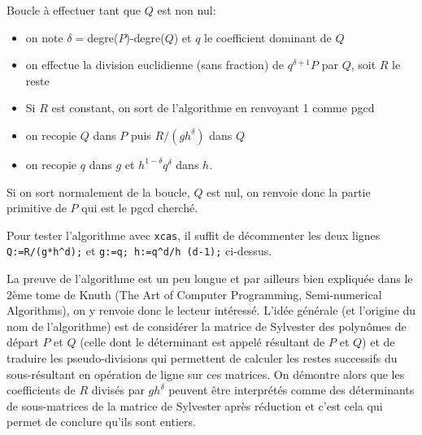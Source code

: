 \documentclass[a4paper,11pt]{book}
\begin{document}
\begin{giacjshere}
Boucle à effectuer tant que $Q$ est non nul:
\begin{itemize}
  \item on note $\delta =$degre($P$)-degre($Q$) et $q$ le coefficient dominant
  de $Q$
  
  \item on effectue la division euclidienne (sans fraction) de $q^{\delta + 1}
  P$ par $Q$, soit $R$ le reste
  
  \item Si $R$ est constant, on sort de l'algorithme en renvoyant 1 comme pgcd
  
  \item on recopie $Q$ dans $P$ puis $R / ( g h^{\delta} )$ dans $Q$
  
  \item on recopie $q$ dans $g$ et $h^{1 - \delta} q^{\delta}$ dans $h$.
\end{itemize}
Si on sort normalement de la boucle, $Q$ est nul, on renvoie donc la partie
primitive de $P$ qui est le pgcd cherché.

Pour tester l'algorithme avec {\tt{xcas}}, il suffit de décommenter les
deux lignes {\tt{Q:=R/(g*h\^{ }d);}} et {\tt{g:=q; h:=q\^{ }d/h\^{
}(d-1);}} ci-dessus.

La preuve de l'algorithme est un peu longue et par ailleurs bien expliqu\'ee
dans le 2ème tome de Knuth (The Art of Computer Programming, Semi-numerical
Algorithms), on y renvoie donc le lecteur intéressé. L'idée générale
(et l'origine du nom de l'algorithme) 
est de considérer la matrice de Sylvester des polynômes de
départ $P$ et $Q$ (celle dont le déterminant est appelé résultant de $P$ et
$Q$) et de traduire les pseudo-divisions qui permettent de calculer les restes
successifs du sous-résultant en opération de ligne sur ces matrices. On
démontre alors que les coefficients de $R$ divisés par $g h^{\delta}$ peuvent
être interprétés comme des déterminants de sous-matrices de la matrice de
Sylvester après réduction et c'est cela qui permet de conclure qu'ils sont
entiers.


\end{giacjshere}
\end{document}
